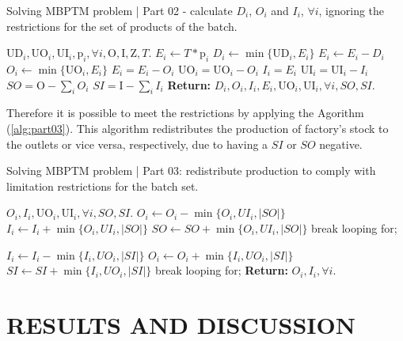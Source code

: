 \documentclass[10pt,fleqn,a4paper,twoside]{article}
\begin{document}
\begin{algorithm}
\caption{Solving MBPTM problem | Part 02 - calculate $D_i$, $O_i$ and $I_i$, $\forall i$, ignoring the restrictions for the set of products of the batch.}\label{alg:part02}
\begin{algorithmic}
	\Require $\textrm{UD}_i, \textrm{UO}_i, \textrm{UI}_i, \textrm{p}_i, \forall i, \textrm{O}, \textrm{I}, \textrm{Z}, T$.
		\State $E_i \gets T * \textrm{p}_i$
		\State $D_i \gets \min \{\textrm{UD}_i, E_i\}$
		\State $E_i \gets E_i - D_i$
		\State $O_i \gets \min \{\textrm{UO}_i, E_i\}$
		\State $E_i = E_i - O_i$
		\State $\textrm{UO}_i = \textrm{UO}_i - O_i$
		\State $I_i = E_i$
		\State $\textrm{UI}_i = \textrm{UI}_i - I_i$
	\EndFor
	\State $SO = \textrm{O} - \sum_i{O_i}$
	\State $SI = \textrm{I} - \sum_i{I_i}$
	\State \textbf{Return:} $D_i, O_i, I_i, E_i, \textrm{UO}_i, \textrm{UI}_i, \forall i, SO, SI$.
\end{algorithmic}
\end{algorithm}

Therefore it is possible to meet the restrictions by applying the Agorithm (\ref{alg:part03}). This algorithm redistributes the production of factory's stock to the outlets or vice versa, respectively, due to having a $SI$ or $SO$ negative.

\begin{algorithm}[h!]
\caption{Solving MBPTM problem | Part 03: redistribute production to comply with limitation restrictions for the batch set.}\label{alg:part03}
\begin{algorithmic}
\Require $O_i, I_i, \textrm{UO}_i, \textrm{UI}_i, \forall i, SO, SI$.
	\State $O_i \gets O_i - \min\{ O_i, UI_i, |SO|\}$
	\State $I_i \gets I_i + \min\{ O_i, UI_i, |SO|\}$
	\State $SO \gets SO + \min\{ O_i, UI_i, |SO|\}$
		break looping for;
	\EndIf
\EndFor
\EndIf

	\State $I_i \gets I_i - \min\{ I_i, UO_i, |SI|\}$
	\State $O_i \gets O_i + \min\{ I_i, UO_i, |SI|\}$
	\State $SI \gets SI + \min\{ I_i, UO_i, |SI|\}$
		break looping for;
	\EndIf
\EndFor
\EndIf
\State \textbf{Return:} $O_i, I_i, \forall i$.
\end{algorithmic}
\end{algorithm}

\section{RESULTS AND DISCUSSION}
\label{sec:results}
\end{document}
